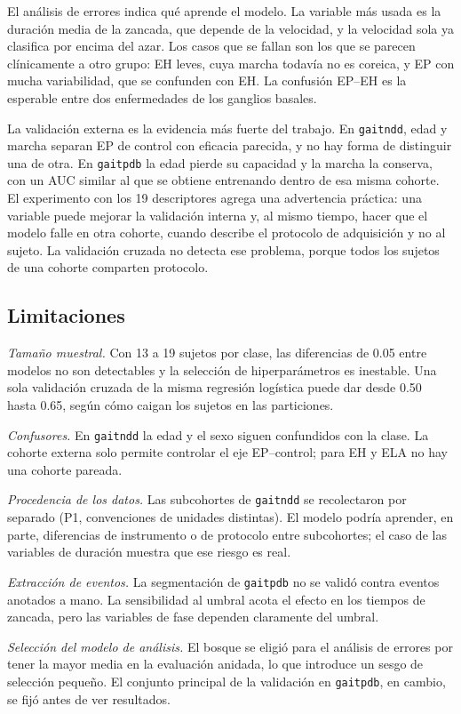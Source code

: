 \documentclass[conference]{IEEEtran}
\newcommand{\gaitndd}{\texttt{gaitndd}}
\newcommand{\gaitpdb}{\texttt{gaitpdb}}
\begin{document}
El análisis de errores indica qué aprende el modelo. La variable más usada es la duración media de la zancada, que depende de la velocidad, y la velocidad sola ya clasifica por encima del azar. Los casos que se fallan son los que se parecen clínicamente a otro grupo: EH leves, cuya marcha todavía no es coreica, y EP con mucha variabilidad, que se confunden con EH. La confusión EP--EH es la esperable entre dos enfermedades de los ganglios basales.

La validación externa es la evidencia más fuerte del trabajo. En \gaitndd, edad y marcha separan EP de control con eficacia parecida, y no hay forma de distinguir una de otra. En \gaitpdb{} la edad pierde su capacidad y la marcha la conserva, con un AUC similar al que se obtiene entrenando dentro de esa misma cohorte. El experimento con los 19 descriptores agrega una advertencia práctica: una variable puede mejorar la validación interna y, al mismo tiempo, hacer que el modelo falle en otra cohorte, cuando describe el protocolo de adquisición y no al sujeto. La validación cruzada no detecta ese problema, porque todos los sujetos de una cohorte comparten protocolo.

\subsection{Limitaciones}
\textit{Tamaño muestral.} Con 13 a 19 sujetos por clase, las diferencias de 0.05 entre modelos no son detectables y la selección de hiperparámetros es inestable. Una sola validación cruzada de la misma regresión logística puede dar desde 0.50 hasta 0.65, según cómo caigan los sujetos en las particiones.

\textit{Confusores.} En \gaitndd{} la edad y el sexo siguen confundidos con la clase. La cohorte externa solo permite controlar el eje EP--control; para EH y ELA no hay una cohorte pareada.

\textit{Procedencia de los datos.} Las subcohortes de \gaitndd{} se recolectaron por separado (P1, convenciones de unidades distintas). El modelo podría aprender, en parte, diferencias de instrumento o de protocolo entre subcohortes; el caso de las variables de duración muestra que ese riesgo es real.

\textit{Extracción de eventos.} La segmentación de \gaitpdb{} no se validó contra eventos anotados a mano. La sensibilidad al umbral acota el efecto en los tiempos de zancada, pero las variables de fase dependen claramente del umbral.

\textit{Selección del modelo de análisis.} El bosque se eligió para el análisis de errores por tener la mayor media en la evaluación anidada, lo que introduce un sesgo de selección pequeño. El conjunto principal de la validación en \gaitpdb{}, en cambio, se fijó antes de ver resultados.
\end{document}
